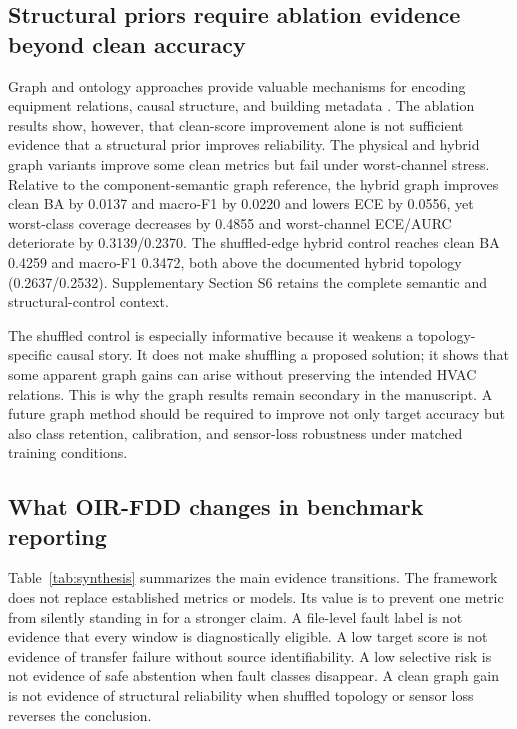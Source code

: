 \documentclass[preprint,12pt]{elsarticle}
\begin{document}
\subsection{Structural priors require ablation evidence beyond clean accuracy}
Graph and ontology approaches provide valuable mechanisms for encoding equipment relations, causal structure, and building metadata \cite{balaji2016brick,zhang2022causal,ghalamsiah2026graph,li2026agentic}. The ablation results show, however, that clean-score improvement alone is not sufficient evidence that a structural prior improves reliability. The physical and hybrid graph variants improve some clean metrics but fail under worst-channel stress. Relative to the component-semantic graph reference, the hybrid graph improves clean BA by 0.0137 and macro-F1 by 0.0220 and lowers ECE by 0.0556, yet worst-class coverage decreases by 0.4855 and worst-channel ECE/AURC deteriorate by 0.3139/0.2370. The shuffled-edge hybrid control reaches clean BA 0.4259 and macro-F1 0.3472, both above the documented hybrid topology (0.2637/0.2532). Supplementary Section S6 retains the complete semantic and structural-control context.

The shuffled control is especially informative because it weakens a topology-specific causal story. It does not make shuffling a proposed solution; it shows that some apparent graph gains can arise without preserving the intended HVAC relations. This is why the graph results remain secondary in the manuscript. A future graph method should be required to improve not only target accuracy but also class retention, calibration, and sensor-loss robustness under matched training conditions.

\subsection{What OIR-FDD changes in benchmark reporting}
Table~\ref{tab:synthesis} summarizes the main evidence transitions. The framework does not replace established metrics or models. Its value is to prevent one metric from silently standing in for a stronger claim. A file-level fault label is not evidence that every window is diagnostically eligible. A low target score is not evidence of transfer failure without source identifiability. A low selective risk is not evidence of safe abstention when fault classes disappear. A clean graph gain is not evidence of structural reliability when shuffled topology or sensor loss reverses the conclusion.
\end{document}
